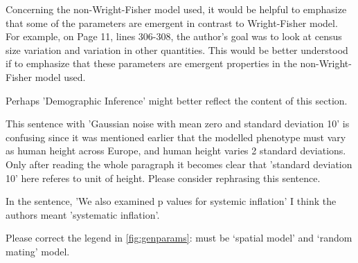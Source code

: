 \begin{point}{}
    Concerning the non-Wright-Fisher model used, it would be helpful to emphasize that some of the parameters are emergent in contrast to Wright-Fisher model. For example, on Page 11, lines 306-308, the author's goal was to look at census size variation and variation in other quantities. This would be better understood if to emphasize that these parameters are emergent properties in the non-Wright-Fisher model used.
\end{point}


\begin{point}{\revref}
    Perhaps 'Demographic Inference' might better reflect the content of this section.
\end{point}


\begin{point}{\revref}
    This sentence with 'Gaussian noise with mean zero and standard deviation 10' is confusing since it was mentioned earlier that the modelled phenotype must vary as human height across Europe, and human height varies 2 standard deviations. Only after reading the whole paragraph it becomes clear that 'standard deviation 10' here referes to unit of height. Please consider rephrasing this sentence.
\end{point}


\begin{point}{\revref}
    In the sentence, 'We also examined p values for systemic inflation' I think the authors meant 'systematic inflation'.
\end{point}


\begin{point}{}
    Please correct the legend in \autoref{fig:genparams}:
    must be `spatial model' and `random mating' model.
\end{point}


